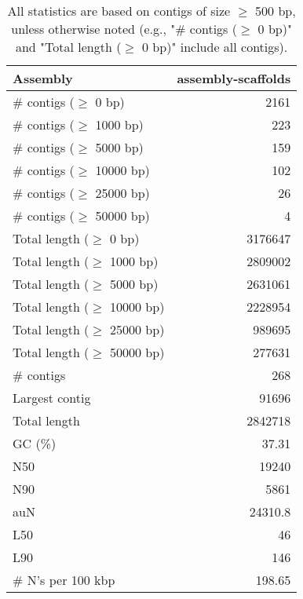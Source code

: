 \documentclass[12pt,a4paper]{article}
\begin{document}
\begin{table}[ht]
\begin{center}
\caption{All statistics are based on contigs of size $\geq$ 500 bp, unless otherwise noted (e.g., "\# contigs ($\geq$ 0 bp)" and "Total length ($\geq$ 0 bp)" include all contigs).}
\begin{tabular}{|l*{1}{|r}|}
\hline
Assembly & assembly-scaffolds \\ \hline
\# contigs ($\geq$ 0 bp) & 2161 \\ \hline
\# contigs ($\geq$ 1000 bp) & 223 \\ \hline
\# contigs ($\geq$ 5000 bp) & 159 \\ \hline
\# contigs ($\geq$ 10000 bp) & 102 \\ \hline
\# contigs ($\geq$ 25000 bp) & 26 \\ \hline
\# contigs ($\geq$ 50000 bp) & 4 \\ \hline
Total length ($\geq$ 0 bp) & 3176647 \\ \hline
Total length ($\geq$ 1000 bp) & 2809002 \\ \hline
Total length ($\geq$ 5000 bp) & 2631061 \\ \hline
Total length ($\geq$ 10000 bp) & 2228954 \\ \hline
Total length ($\geq$ 25000 bp) & 989695 \\ \hline
Total length ($\geq$ 50000 bp) & 277631 \\ \hline
\# contigs & 268 \\ \hline
Largest contig & 91696 \\ \hline
Total length & 2842718 \\ \hline
GC (\%) & 37.31 \\ \hline
N50 & 19240 \\ \hline
N90 & 5861 \\ \hline
auN & 24310.8 \\ \hline
L50 & 46 \\ \hline
L90 & 146 \\ \hline
\# N's per 100 kbp & 198.65 \\ \hline
\end{tabular}
\end{center}
\end{table}
\end{document}
